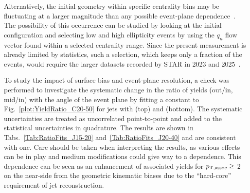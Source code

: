 Alternatively, the initial geometry within specific centrality bins may be fluctuating at a larger magnitude than any possible event-plane dependence~\cite{Noronha-Hostler-RAAv2,PhysRevLett.116.252301}.  The possibility of this occurrence can be studied by looking at the initial configuration and selecting low and high ellipticity events by  using the $q_n$ flow vector found within a selected centrality range.  Since the present measurement is already limited by statistics, such a selection, which keeps only a fraction of the events, would require the larger \AuAu datasets recorded by STAR in 2023 and 2025~\cite{RHICRunSummary}.

To study the impact of surface bias and event-plane resolution, a check was performed to investigate the systematic change in the ratio of yields (out/in, mid/in) with the angle of the event plane by fitting a constant to Fig.~\ref{plot:YieldRatio_C20-50} for jets with  (top) and  (bottom).  The systematic uncertainties are treated as uncorrelated point-to-point and added to the statistical uncertainties in quadrature.  The results are shown in Tabs.~\ref{Tab:RatioFits_J15-20} and~\ref{Tab:RatioFits_J20-40} and are consistent with one.  Care should be taken when interpreting the results, as various effects can be in play and medium modifications could give way to a  dependence. This  dependence can be seen as an enhancement of associated yields for $p_{\mathrm{T, assoc}} \geq$ 2 \GeVc on the near-side from the geometric kinematic biases due to the ``hard-core'' requirement of jet reconstruction.   

